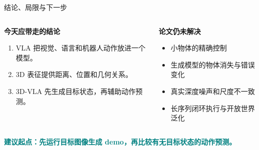\documentclass[aspectratio=169,11pt]{ctexbeamer}
\newcommand{\tealbold}[1]{\textcolor{Teal}{\textbf{#1}}}
\newcommand{\insertframesource}{}
\newcommand{\setsource}[1]{\gdef\insertframesource{#1}}
\begin{document}
\setsource{Ref.: [1] H. Zhen \emph{et al.}, ``3D-VLA: A 3D Vision-Language-Action Generative World Model,'' in \emph{Proc. ICML}, vol. 235, 2024, Secs. 6--7.}
\begin{frame}{结论、局限与下一步}
\begin{columns}[T,onlytextwidth]
\begin{column}{0.49\textwidth}
\textbf{今天应带走的结论}
\begin{enumerate}\item VLA 把视觉、语言和机器人动作放进一个模型。\item 3D 表征提供距离、位置和几何关系。\item 3D-VLA 先生成目标状态，再辅助动作预测。\end{enumerate}
\end{column}
\begin{column}{0.45\textwidth}
\textbf{论文仍未解决}
\begin{itemize}\item 小物体的精确控制\item 生成模型的物体消失与错误变化\item 真实深度噪声和尺度不一致\item 长序列闭环执行与开放世界泛化\end{itemize}
\end{column}
\end{columns}
\vspace{0.32cm}
\begin{center}\large\tealbold{建议起点：先运行目标图像生成 demo，再比较有无目标状态的动作预测。}\end{center}
\end{frame}
\end{document}
